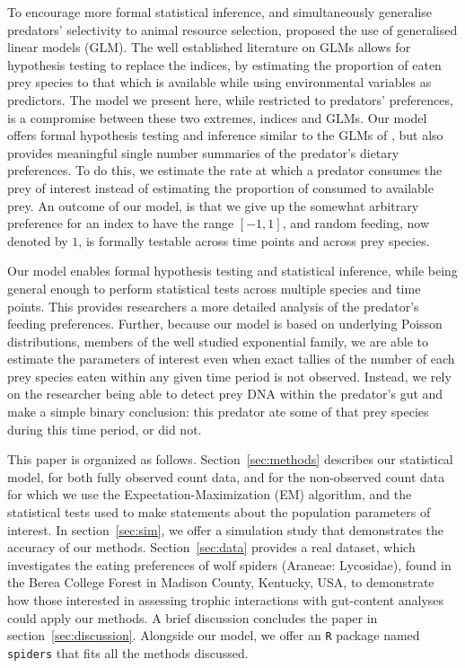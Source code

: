 To encourage more formal statistical inference, and simultaneously generalise predators' selectivity to animal resource selection, \citet{Manly:1992} proposed the use of generalised linear models (GLM).  The well established literature on GLMs allows for hypothesis testing to replace the indices, by estimating the proportion of eaten prey species to that which is available while using environmental variables as predictors.  The model we present here, while restricted to predators' preferences, is a compromise between these two extremes, indices and GLMs.  Our model offers formal hypothesis testing and inference similar to the GLMs of \citet{Manly:1992}, but also provides meaningful single number summaries of the predator's dietary preferences.  To do this, we estimate the rate at which a predator consumes the prey of interest instead of estimating the proportion of consumed to available prey.  An outcome of our model, is that we give up the somewhat arbitrary preference for an index to have the range $[-1,1]$, and random feeding, now denoted by $1$, is formally testable across time points and across prey species.

Our model enables formal hypothesis testing and statistical inference, while being general enough to perform statistical tests across multiple species and time points.  This provides researchers a more detailed analysis of the predator's feeding preferences.  Further, because our model is based on underlying Poisson distributions, members of the well studied exponential family, we are able to estimate the parameters of interest even when exact tallies of the number of each prey species eaten within any given time period is not observed.  Instead, we rely on the researcher being able to detect prey DNA within the predator's gut \citep{Schmidt:2014,Raso:2014,Madduppa:2014} and make a simple binary conclusion: this predator ate some of that prey species during this time period, or did not.  

This paper is organized as follows.  Section~\ref{sec:methods} describes our statistical model, for both fully observed count data, and for the non-observed count data for which we use the Expectation-Maximization (EM) algorithm, and the statistical tests used to make statements about the population parameters of interest.  In section~\ref{sec:sim}, we offer a simulation study that demonstrates the accuracy of our methods.  Section~\ref{sec:data} provides a real dataset, which investigates the eating preferences of wolf spiders (Araneae: Lycosidae), found in the Berea College Forest in Madison County, Kentucky, USA, to demonstrate how those interested in assessing trophic interactions with gut-content analyses could apply our methods.  A brief discussion concludes the paper in section~\ref{sec:discussion}.  Alongside our model, we offer an \texttt{R} \citep{Core-Team:2014} package named \texttt{spiders} that fits all the methods discussed.  

